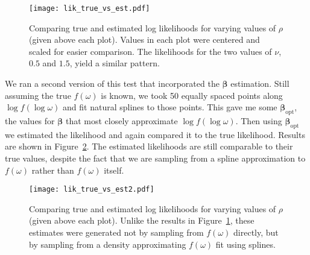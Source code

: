 \begin{figure}[!htb]
	\centering
	\texttt{[image: lik\_true\_vs\_est.pdf]}
	\caption{\small Comparing true and estimated log likelihoods for varying values of $\rho$ (given above each plot). Values in each plot were centered and scaled for easier comparison. The likelihoods for the two values of $\nu$, $0.5$ and $1.5$, yield a similar pattern.}
	\label{fig:liks_by_rho}
\end{figure}


We ran a second version of this test that incorporated the $\bm{\beta}$ estimation. Still assuming the true $f(\omega)$ is known, we took 50 equally spaced points along $\log f(\log \omega)$ and fit natural splines to those points. This gave me some $\bm{\beta}_{\textrm{opt}}$, the values for $\bm{\beta}$ that most closely approximate $\log f(\log \omega)$. Then using $\bm{\beta}_{\textrm{opt}}$ we estimated the likelihood and again compared it to the true likelihood. Results are shown in Figure~\ref{fig:estliks_spline_rho}. The estimated likelihoods are still comparable to their true values, despite the fact that we are sampling from a spline approximation to $f(\omega)$ rather than $f(\omega)$ itself.

\begin{figure}[!htb]
	\centering
	\texttt{[image: lik\_true\_vs\_est2.pdf]}
	\caption{\small Comparing true and estimated log likelihoods for varying values of $\rho$ (given above each plot). Unlike the results in Figure~\ref{fig:liks_by_rho}, these estimates were generated not by sampling from $f(\omega)$ directly, but by sampling from a density approximating $f(\omega)$ fit using splines.}
	\label{fig:estliks_spline_rho}
\end{figure}


